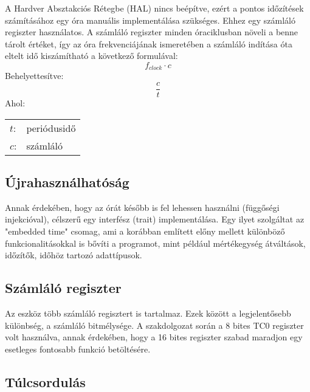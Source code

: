 \label{ora}

A Hardver Absztakciós Rétegbe (HAL) nincs beépítve, ezért a pontos időzítések számításához egy óra manuális implementálása szükséges.
Ehhez egy számláló regiszter használatos. A számláló regiszter minden óraciklusban növeli a benne tárolt értéket, így az óra frekvenciájának ismeretében a számláló indítása óta eltelt idő kiszámítható a következő formulával: \[f_{clock} \cdot c\]
Behelyettesítve:\[\frac{c}{t}\]
Ahol:
\captionsetup[table]{list=no}
\begin{table}[H]
    \begin{tabular}{ll}
    $t$:    &periódusidő \\
    $c$:    &számláló
    \end{tabular}
\end{table}	
\captionsetup[table]{list=yes}

\subsection{Újrahasználhatóság}

Annak érdekében, hogy az órát később is fel lehessen használni (függőségi injekcióval), célszerű egy interfész (trait) implementálása. Egy ilyet szolgáltat az "embedded time" csomag, ami a korábban említett előny mellett különböző funkcionalitásokkal is bővíti a programot, mint például mértékegység átváltások, időzítők, időhöz tartozó adattípusok.

\subsection{Számláló regiszter}

Az eszköz több számláló regisztert is tartalmaz. Ezek között a legjelentősebb különbség, a számláló bitmélysége.
A szakdolgozat során a 8 bites TC0 regiszter volt használva, annak érdekében, hogy a 16 bites regiszter szabad maradjon egy esetleges fontosabb funkció betöltésére.

\subsection{Túlcsordulás}

